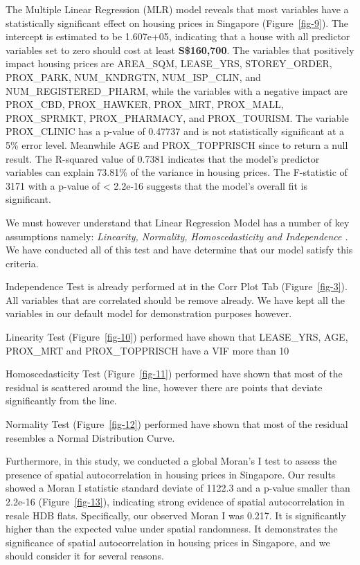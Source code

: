 \documentclass[manuscript,screen]{acmart}
\begin{document}
The Multiple Linear Regression (MLR) model reveals that most variables
have a statistically significant effect on housing prices in Singapore
(Figure~\ref{fig-9}). The intercept is estimated to be 1.607e+05,
indicating that a house with all predictor variables set to zero should
cost at least \textbf{S\$160,700}. The variables that positively impact
housing prices are AREA\_SQM, LEASE\_YRS, STOREY\_ORDER, PROX\_PARK,
NUM\_KNDRGTN, NUM\_ISP\_CLIN, and NUM\_REGISTERED\_PHARM, while the
variables with a negative impact are PROX\_CBD, PROX\_HAWKER, PROX\_MRT,
PROX\_MALL, PROX\_SPRMKT, PROX\_PHARMACY, and PROX\_TOURISM. The
variable PROX\_CLINIC has a p-value of 0.47737 and is not statistically
significant at a 5\% error level. Meanwhile AGE and PROX\_TOPPRISCH
since to return a null result. The R-squared value of 0.7381 indicates
that the model's predictor variables can explain 73.81\% of the variance
in housing prices. The F-statistic of 3171 with a p-value of \textless{}
2.2e-16 suggests that the model's overall fit is significant.

We must however understand that Linear Regression Model has a number of
key assumptions namely: \emph{Linearity, Normality, Homoscedasticity and
Independence} \citep{ernst2017}\emph{.} We have conducted all of this
test and have determine that our model satisfy this criteria.

Independence Test is already performed at in the Corr Plot Tab
(Figure~\ref{fig-3}). All variables that are correlated should be remove
already. We have kept all the variables in our default model for
demonstration purposes however.

Linearity Test (Figure~\ref{fig-10}) performed have shown that
LEASE\_YRS, AGE, PROX\_MRT and PROX\_TOPPRISCH have a VIF more than 10

Homoscedasticity Test (Figure~\ref{fig-11}) performed have shown that
most of the residual is scattered around the line, however there are
points that deviate significantly from the line.

Normality Test (Figure~\ref{fig-12}) performed have shown that most of
the residual resembles a Normal Distribution Curve.

Furthermore, in this study, we conducted a global Moran's I test to
assess the presence of spatial autocorrelation in housing prices in
Singapore. Our results showed a Moran I statistic standard deviate of
1122.3 and a p-value smaller than 2.2e-16 (Figure~\ref{fig-13}),
indicating strong evidence of spatial autocorrelation in resale HDB
flats. Specifically, our observed Moran I was 0.217. It is significantly
higher than the expected value under spatial randomness. It demonstrates
the significance of spatial autocorrelation in housing prices in
Singapore, and we should consider it for several reasons.
\end{document}
